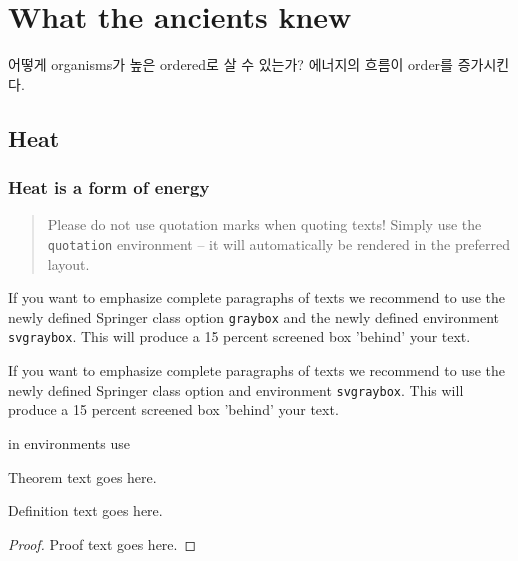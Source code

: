 %
%
%
\chapter{What the ancients knew}
어떻게 organisms가 높은 ordered로 살 수 있는가? 에너지의 흐름이 order를 증가시킨다.

\section{Heat}

\subsection{Heat is a form of energy}


\begin{quotation}
Please do not use quotation marks when quoting texts! Simply use the \verb|quotation| environment -- it will automatically be rendered in the preferred layout.
\end{quotation}


\begin{svgraybox}
If you want to emphasize complete paragraphs of texts we recommend to use the newly defined Springer class option \verb|graybox| and the newly defined environment \verb|svgraybox|. This will produce a 15 percent screened box 'behind' your text.

If you want to emphasize complete paragraphs of texts we recommend to use the newly defined Springer class option and environment \verb|svgraybox|. This will produce a 15 percent screened box 'behind' your text.
\end{svgraybox}
in environments use
%
\begin{theorem}
Theorem text goes here.
\end{theorem}
%
\begin{definition}
Definition text goes here.
\end{definition}
%
\begin{proof}
Proof text goes here.
\end{proof}
%
%

%
